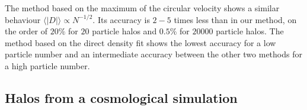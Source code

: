 \documentclass[a4,useAMS,usenatbib,usegraphicx]{mn2e}
\newcommand{\avg}[1]{\langle{#1}\rangle}
\begin{document}
The method based on the maximum of the circular velocity shows a similar
behaviour $\avg{|D|}\propto N^{-1/2}$. 
Its accuracy is $2-5$ times less
than in our method, on the order of $20\%$ for $20$ particle halos and
$0.5\%$ for $20000$ particle halos. 
The method based on the direct density
fit shows the lowest accuracy for a low particle number and an intermediate
accuracy between the other two methods for a high particle number.

\subsection{Halos from a cosmological simulation}



\end{document}
